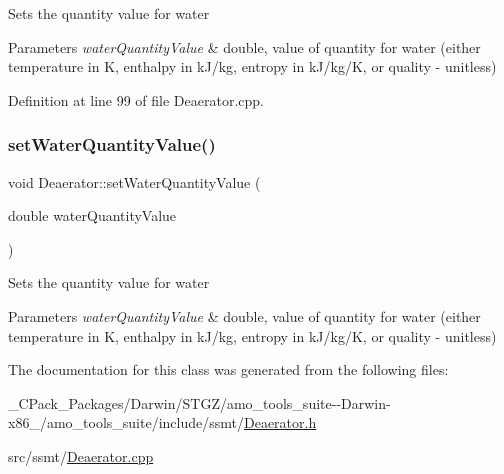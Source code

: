 Sets the quantity value for water 
\begin{DoxyParams}{Parameters}
{\em water\+Quantity\+Value} & double, value of quantity for water (either temperature in K, enthalpy in k\+J/kg, entropy in k\+J/kg/K, or quality -\/ unitless) \\
\hline
\end{DoxyParams}


Definition at line 99 of file Deaerator.\+cpp.

\mbox{\label{class_deaerator_ac31cf2deb8bf30ee6921d1d9f8281eb8}} 
\subsubsection{\texorpdfstring{set\+Water\+Quantity\+Value()}{setWaterQuantityValue()}\hspace{0.1cm}{\footnotesize\ttfamily [3/3]}}
{\footnotesize\ttfamily void Deaerator\+::set\+Water\+Quantity\+Value (\begin{DoxyParamCaption}\item[{double}]{water\+Quantity\+Value }\end{DoxyParamCaption})}

Sets the quantity value for water 
\begin{DoxyParams}{Parameters}
{\em water\+Quantity\+Value} & double, value of quantity for water (either temperature in K, enthalpy in k\+J/kg, entropy in k\+J/kg/K, or quality -\/ unitless) \\
\hline
\end{DoxyParams}


The documentation for this class was generated from the following files\+:\begin{DoxyCompactItemize}
\item 
\+\_\+\+C\+Pack\+\_\+\+Packages/\+Darwin/\+S\+T\+G\+Z/amo\+\_\+tools\+\_\+suite-\/-\/\+Darwin-\/x86\+\_/amo\+\_\+tools\+\_\+suite/include/ssmt/\hyperlink{___c_pack___packages_2_darwin_2_s_t_g_z_2amo__tools__suite--_darwin-x86__64_2amo__tools__suite_2include_2ssmt_2_deaerator_8h}{Deaerator.\+h}\item 
src/ssmt/\hyperlink{_deaerator_8cpp}{Deaerator.\+cpp}\end{DoxyCompactItemize}
